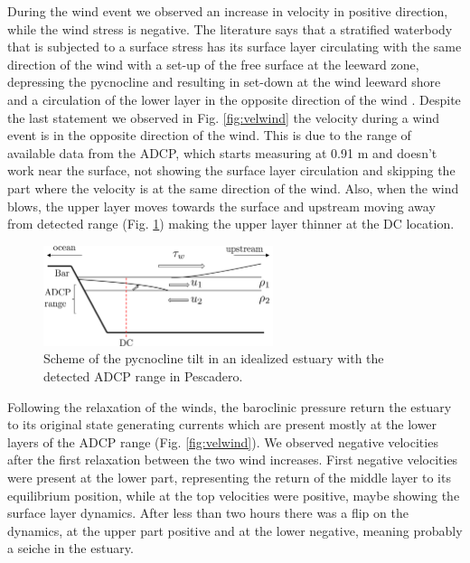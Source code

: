 \documentclass[tesis.tex]{subfiles}
\begin{document}
During the wind event we observed an increase in velocity in positive direction, while the wind stress is negative. The literature says that a stratified waterbody that is subjected to a surface stress has its surface layer circulating with the same direction of the wind with a set-up of the free surface at the leeward zone, depressing the pycnocline and resulting in set-down at the wind leeward shore and a circulation of the lower layer in the opposite direction of the wind \citep{Katopodes2018}. Despite the last statement we observed in Fig. \ref{fig:velwind} the velocity during a wind event is in the opposite direction of the wind. This is due to the range of available data from the ADCP, which starts measuring at 0.91 m and doesn't work near the surface, not showing the surface layer circulation and skipping the part where the velocity is at the same direction of the wind. Also, when the wind blows, the upper layer moves towards the surface and upstream moving away from detected range (Fig. \ref{fig:adcp}) making the upper layer thinner at the DC location.\\

\begin{figure}[h!]
    \centering
    \includegraphics[width=0.6\textwidth]{Imagenes/ADCP_range.png}
    \caption{Scheme of the pycnocline tilt in an idealized estuary with the detected ADCP range in Pescadero.}
    \label{fig:adcp}
\end{figure}

Following the relaxation of the winds, the baroclinic pressure return the estuary to its original state generating currents which are present mostly at the lower layers of the ADCP range (Fig. \ref{fig:velwind}). We observed negative velocities after the first relaxation between the two wind increases. First negative velocities were present at the lower part, representing the return of the middle layer to its equilibrium position, while at the top velocities were positive, maybe showing the surface layer dynamics. After less than two hours there was a flip on the dynamics, at the upper part positive and at the lower negative, meaning probably a seiche in the estuary.\\
\end{document}
